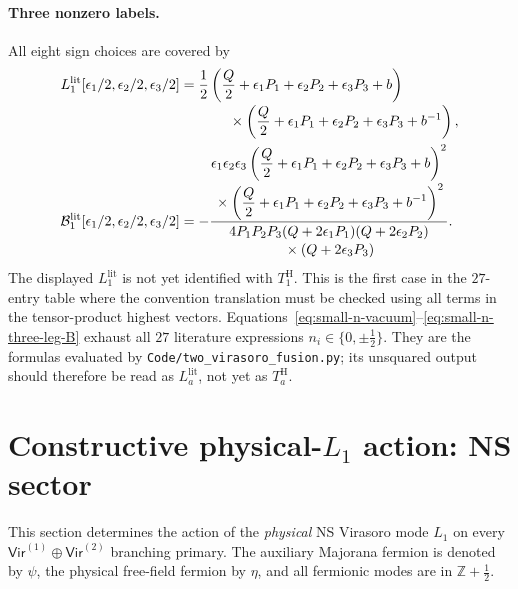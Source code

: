 \documentclass[11pt]{article}
\newcommand{\Vir}{\mathsf{Vir}}
\begin{document}
\paragraph{Three nonzero labels.}
All eight sign choices are covered by
\begin{align}
 L_1^{\mathrm{lit}}[\epsilon_1/2,\epsilon_2/2,\epsilon_3/2]
 &=\frac12
 \left(
 \frac Q2+\epsilon_1P_1+\epsilon_2P_2+\epsilon_3P_3+b
 \right)
 \notag\\[-0.2em]
 &\hspace{3.5em}\times
 \left(
 \frac Q2+\epsilon_1P_1+\epsilon_2P_2+\epsilon_3P_3+b^{-1}
 \right),
 \label{eq:small-n-three-leg-T}\\
 \mathcal B_1^{\mathrm{lit}}[\epsilon_1/2,\epsilon_2/2,\epsilon_3/2]
 &=
 -\frac{
 \begin{gathered}
 \epsilon_1\epsilon_2\epsilon_3
 \left(
 \frac Q2+\epsilon_1P_1+\epsilon_2P_2+\epsilon_3P_3+b
 \right)^2\\[-0.2em]
 {}\times
 \left(
 \frac Q2+\epsilon_1P_1+\epsilon_2P_2+\epsilon_3P_3+b^{-1}
 \right)^2
 \end{gathered}
 }{
 \begin{gathered}
 4P_1P_2P_3
 (Q+2\epsilon_1P_1)(Q+2\epsilon_2P_2)\\[-0.2em]
 {}\times(Q+2\epsilon_3P_3)
 \end{gathered}
 }.
 \label{eq:small-n-three-leg-B}
\end{align}
The displayed \(L_1^{\mathrm{lit}}\) is not yet identified with
\(T_1^{\mathrm H}\).  This is the first case in the \(27\)-entry table where
the convention translation must be checked using all terms in the
tensor-product highest vectors.
Equations~\eqref{eq:small-n-vacuum}--\eqref{eq:small-n-three-leg-B}
exhaust all \(27\) literature expressions
\(n_i\in\{0,\pm\frac12\}\).  They are the formulas evaluated by
\texttt{Code/two\_virasoro\_fusion.py}; its unsquared output should therefore
be read as \(L_a^{\mathrm{lit}}\), not yet as \(T_a^{\mathrm H}\).

\section{Constructive physical-\texorpdfstring{\(L_1\)}{L1} action:
NS sector}
\label{sec:constructive-physical-L1-NS}

This section determines the action of the \emph{physical} NS Virasoro mode
\(L_1\) on every \(\Vir^{(1)}\oplus\Vir^{(2)}\) branching primary.  The
auxiliary Majorana fermion is denoted by \(\psi\), the physical free-field
fermion by \(\eta\), and all fermionic modes are in
\(\mathbb Z+\frac12\).
\end{document}
